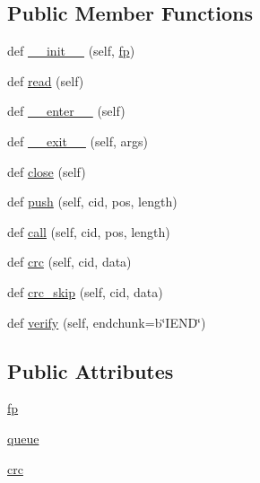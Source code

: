 \subsection*{Public Member Functions}
\begin{DoxyCompactItemize}
\item 
def \hyperlink{classPIL_1_1PngImagePlugin_1_1ChunkStream_a65ebb34a0f4b70583019c61f73aeeae6}{\+\_\+\+\_\+init\+\_\+\+\_\+} (self, \hyperlink{classPIL_1_1PngImagePlugin_1_1ChunkStream_ae424bdb25dadd6b9ed72b6b320237703}{fp})
\item 
def \hyperlink{classPIL_1_1PngImagePlugin_1_1ChunkStream_a6b456a23d2cd76e94d12d881afe973dd}{read} (self)
\item 
def \hyperlink{classPIL_1_1PngImagePlugin_1_1ChunkStream_a818a523d24ffd48b11565a65adb544a7}{\+\_\+\+\_\+enter\+\_\+\+\_\+} (self)
\item 
def \hyperlink{classPIL_1_1PngImagePlugin_1_1ChunkStream_ae0303cd159ec357507d0cf0d9848e936}{\+\_\+\+\_\+exit\+\_\+\+\_\+} (self, args)
\item 
def \hyperlink{classPIL_1_1PngImagePlugin_1_1ChunkStream_ac5550e8b88443332f945a528b642a0a4}{close} (self)
\item 
def \hyperlink{classPIL_1_1PngImagePlugin_1_1ChunkStream_a112bf7efb0b59da36085c1bdc677609c}{push} (self, cid, pos, length)
\item 
def \hyperlink{classPIL_1_1PngImagePlugin_1_1ChunkStream_a82be5615d0274c20b979601a0548b5d0}{call} (self, cid, pos, length)
\item 
def \hyperlink{classPIL_1_1PngImagePlugin_1_1ChunkStream_a33d3a9d8411cffc7f73d5758e548b2ad}{crc} (self, cid, data)
\item 
def \hyperlink{classPIL_1_1PngImagePlugin_1_1ChunkStream_ae7ad950fef8c0aff2f456c0e81ae6eb1}{crc\+\_\+skip} (self, cid, data)
\item 
def \hyperlink{classPIL_1_1PngImagePlugin_1_1ChunkStream_ae5e1f1b92fd7f2e3409184c231dabeb8}{verify} (self, endchunk=b\char`\"{}I\+E\+ND\char`\"{})
\end{DoxyCompactItemize}
\subsection*{Public Attributes}
\begin{DoxyCompactItemize}
\item 
\hyperlink{classPIL_1_1PngImagePlugin_1_1ChunkStream_ae424bdb25dadd6b9ed72b6b320237703}{fp}
\item 
\hyperlink{classPIL_1_1PngImagePlugin_1_1ChunkStream_a41da51e1e1eb79042b30d6aeed6a3c75}{queue}
\item 
\hyperlink{classPIL_1_1PngImagePlugin_1_1ChunkStream_a7f530dd2be268b2b51495a3885ce5885}{crc}
\end{DoxyCompactItemize}


